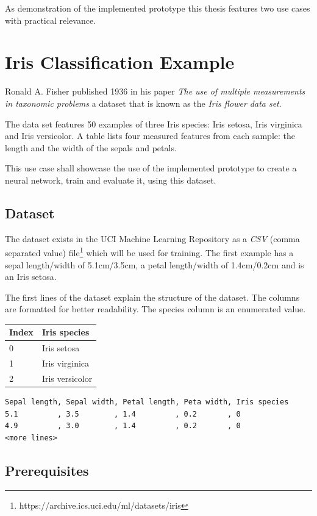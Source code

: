 As demonstration of the implemented prototype this thesis features two
use cases with practical relevance.

\section{Iris Classification Example}\label{iris-classification-example}

Ronald A. Fisher published 1936 in his paper \emph{The use of multiple
measurements in taxonomic problems} \cite{fisher} a dataset that is
known as the \emph{Iris flower data set}.

The data set \cite{fisher} features 50 examples of three Iris species:
Iris setosa, Iris virginica and Iris versicolor. A table lists four
measured features from each sample: the length and the width of the
sepals and petals.

This use case shall showcase the use of the implemented prototype to
create a neural network, train and evaluate it, using this dataset.

\subsection{Dataset}\label{dataset}

The dataset exists in the UCI Machine Learning Repository
\cite{uci-iris} as a \emph{CSV} (comma separated value) file\footnote{https://archive.ics.uci.edu/ml/datasets/iris}
which will be used for training. The first example has a sepal
length/width of 5.1cm/3.5cm, a petal length/width of 1.4cm/0.2cm and is
an Iris setosa.

The first lines of the dataset explain the structure of the dataset. The
columns are formatted for better readability. The species column is an
enumerated value.

\begin{longtable}[]{@{}ll@{}}
\toprule
Index & Iris species\tabularnewline
\midrule
\endhead
0 & Iris setosa\tabularnewline
1 & Iris virginica\tabularnewline
2 & Iris versicolor\tabularnewline
\bottomrule
\end{longtable}

\begin{verbatim}
Sepal length, Sepal width, Petal length, Peta width, Iris species
5.1         , 3.5        , 1.4         , 0.2       , 0
4.9         , 3.0        , 1.4         , 0.2       , 0
<more lines>
\end{verbatim}

\subsection{Prerequisites}\label{prerequisites}

